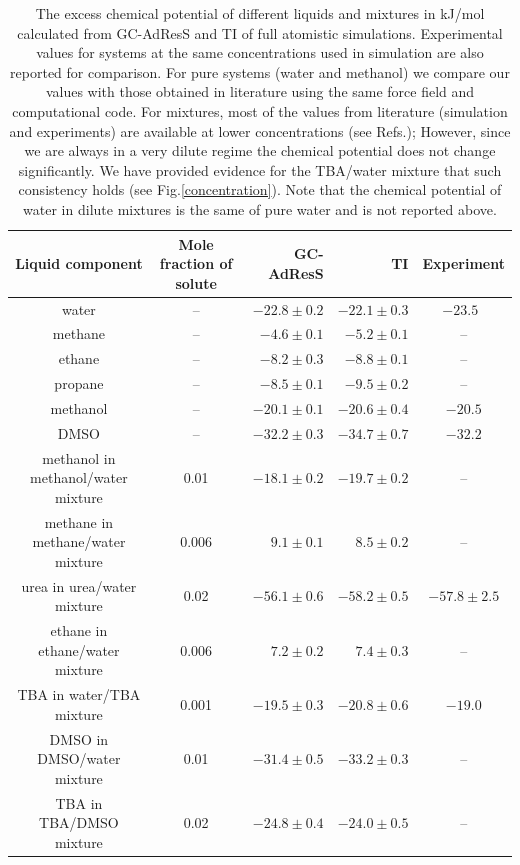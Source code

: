 \documentclass[a4paper,preprint,unsortedaddress]{revtex4-1}
\begin{document}
\begin{table}[]
\begin{center}
\begin{tabular}{ccrrc}
\hline \hline
 Liquid component & Mole fraction of solute & GC-AdResS & TI & Experiment \\
\hline
{water} & -- & $-22.8 \pm 0.2$  & $-22.1 \pm 0.3$ & $-23.5$~\cite{florian} \\
methane  & -- & $-4.6 \pm 0.1$  & $-5.2 \pm 0.1$ & -- \\
ethane   & -- & $-8.2 \pm 0.3$  & $-8.8 \pm 0.1$ & -- \\
propane  & -- & $-8.5 \pm 0.1$ & $-9.5 \pm 0.2$ & -- \\
{methanol}  & -- & $-20.1 \pm 0.1$ & $-20.6 \pm 0.4$ & $-20.5$ \cite{vang}  \\
DMSO & -- & $-32.2 \pm 0.3$ & $-34.7 \pm 0.7$ & $-32.2$ \cite{dmso}  \\
{methanol in methanol/water mixture} & 0.01 & $-18.1 \pm 0.2$ & $-19.7 \pm 0.2$ & -- \\
{methane in methane/water mixture} & 0.006 & $9.1 \pm 0.1$  & $8.5 \pm 0.2$ & -- \\
urea in urea/water mixture & 0.02 & $-56.1 \pm 0.6$ & $-58.2 \pm 0.5$ & $-57.8 \pm 2.5$ \cite{urea} \\
{ethane in ethane/water mixture} & 0.006 & $7.2 \pm 0.2$ & $7.4 \pm 0.3$ & -- \\ 
{TBA in water/TBA mixture} & 0.001 & $-19.5 \pm 0.3$ & $-20.8 \pm 0.6$ & $-19.0$ \cite{nico} \\
DMSO in DMSO/water mixture & 0.01 & $-31.4 \pm 0.5$ & $-33.2 \pm 0.3$ & -- \\
TBA in TBA/DMSO mixture & 0.02 & $-24.8 \pm 0.4$ & $-24.0 \pm 0.5$ & -- \\
\hline \hline
\end{tabular}
\caption{The excess chemical potential of different liquids and mixtures in kJ/mol calculated from GC-AdResS and TI of full atomistic simulations. Experimental values for systems at the same concentrations used in simulation are also reported for comparison. For pure systems (water and methanol) we compare our values with those obtained in literature using the same force field and computational code. For mixtures, most of the values from literature (simulation and experiments) are available at lower concentrations (see Refs.\cite{vang,nico}); However, since we are always in a very dilute regime the chemical potential does not change significantly. {We have provided evidence for the TBA/water mixture that such consistency holds (see Fig.\ref{concentration})}. Note that the chemical potential of water in dilute mixtures is the same of pure water and is not reported above.
}
\label{table}
\end{center}
\end{table}
\end{document}
